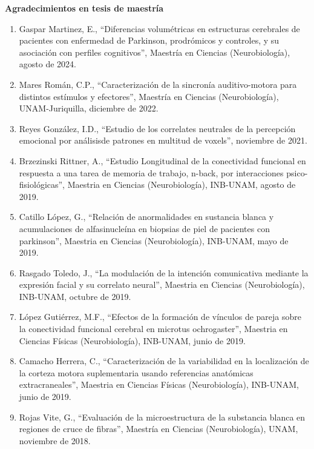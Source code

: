 \textbf{Agradecimientos en tesis de maestría}

\begin{enumerate}

\item Gaspar Martinez, E., “Diferencias volumétricas en estructuras cerebrales de pacientes con enfermedad de Parkinson, prodrómicos y 
controles, y 
su asociación con perfiles cognitivos”, Maestría en Ciencias (Neurobiología), agosto de 2024.

\item Mares Román, C.P., “Caracterización de la sincronía auditivo-motora para distintos estímulos y efectores”, Maestría en Ciencias 
(Neurobiología), UNAM-Juriquilla, diciembre de 2022.

\item Reyes González, I.D., “Estudio de los correlates neutrales de la percepción emocional por análisisde patrones en multitud de voxels”, 
noviembre de 2021.

\item Brzezinski Rittner, A., “Estudio Longitudinal de la conectividad funcional en respuesta a una tarea de memoria de trabajo, n-back, por 
interacciones psico-fisiológicas”, Maestria en Ciencias (Neurobiología), INB-UNAM, agosto de 2019.

\item Catillo López, G., “Relación de anormalidades en sustancia blanca y acumulaciones de alfasinucleína en biopsias de piel de pacientes 
con 
parkinson”, Maestria en Ciencias (Neurobiología), INB-UNAM, mayo de 2019.

\item Rasgado Toledo, J., “La modulación de la intención comunicativa mediante la expresión facial y su correlato neural”, Maestria en 
Ciencias 
(Neurobiología), INB-UNAM, octubre de 2019.

\item López Gutiérrez, M.F., “Efectos de la formación de vínculos de pareja sobre la conectividad funcional cerebral en microtus 
ochrogaster”, 
Maestria en Ciencias Físicas (Neurobiología), INB-UNAM, junio de 2019.

\item Camacho Herrera, C., “Caracterización de la variabilidad en la localización de la corteza motora suplementaria usando referencias 
anatómicas 
extracraneales”, Maestria en Ciencias Físicas (Neurobiología), INB-UNAM, junio de 2019.

\item Rojas Vite, G., “Evaluación de la microestructura de la substancia blanca en regiones de cruce de fibras”, Maestría en Ciencias 
(Neurobiología), UNAM, noviembre de 2018.


\end{enumerate}
